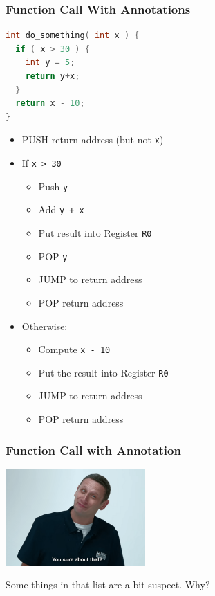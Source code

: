 \begin{frame}[fragile]
\frametitle{Function Call With Annotations}

\begin{lstlisting}[language=C]
int do_something( int x ) {
  if ( x > 30 ) {
    int y = 5;
    return y+x;
  }
  return x - 10;
}
\end{lstlisting}

\begin{itemize}
	\item PUSH return address (but not \texttt{x})
	\item If \texttt{x > 30}
		\begin{itemize}
			\item Push \texttt{y}
			\item Add \texttt{y + x}
			\item Put result into Register \texttt{R0}
			\item POP \texttt{y}
			\item JUMP to return address
			\item POP return address
		\end{itemize}
	\item Otherwise:
		\begin{itemize}
		\item Compute \texttt{x - 10}
		\item Put the result into Register \texttt{R0}
		\item JUMP to return address
		\item POP return address
	\end{itemize}
\end{itemize}


\end{frame}


\begin{frame}
\frametitle{Function Call with Annotation}

\begin{center}
	\includegraphics[width=0.4\textwidth]{images/sureaboutthat.png}
\end{center}

Some things in that list are a bit suspect. Why?

\end{frame}


